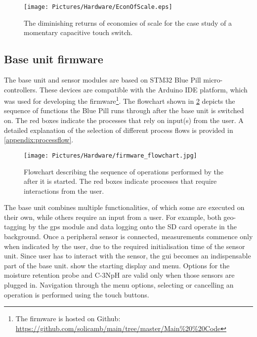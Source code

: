  \begin{figure}
		    \centering
		    \texttt{[image: Pictures/Hardware/EconOfScale.eps]}
		    \captionsetup{justification = centering}
			\caption{The diminishing returns of economies of scale for the case study of a momentary capacitive touch switch.}
			\label{fig:JM_EconOfScale}
    	\end{figure}


\subsection{Base unit firmware}

The base unit and sensor modules are based on STM32 Blue Pill micro-controllers. These devices are compatible with the Arduino \gls{IDE} platform, which was used for developing the  firmware\footnote{The firmware is hosted on Github: \url{https://github.com/solicamb/main/tree/master/Main\%20\%20Code}}. The flowchart shown in \cref{firmware_flowchart} depicts the sequence of functions the Blue Pill runs through after the base unit is switched on. The red boxes indicate the processes that rely on input(s) from the user. A detailed explanation of the selection of different process flows is provided in \cref{appendix:processflow}.

\begin{figure}
            \centering
            \texttt{[image: Pictures/Hardware/firmware\_flowchart.jpg]}
            \captionsetup{justification = centering}
            \caption{Flowchart describing the sequence of operations performed by the  after it is started. The red boxes indicate processes that require interactions from the user.}
            \label{firmware_flowchart}
        \end{figure}

The base unit combines multiple functionalities, of which some are executed on their own, while others require an input from a user. For example, both geo-tagging by the \gls{gps} module and data logging onto the SD card operate in the background. Once a peripheral sensor is connected, measurements commence only when indicated by the user, due to the required initialisation time of the sensor unit. Since user has to interact with the sensor, the \gls{gui} becomes an indispensable part of the base unit.  show the starting display and menu. Options for the moisture retention probe and C-3NpH are valid only when those sensors are plugged in. Navigation through the menu options, selecting or cancelling an operation is performed using the touch buttons.

